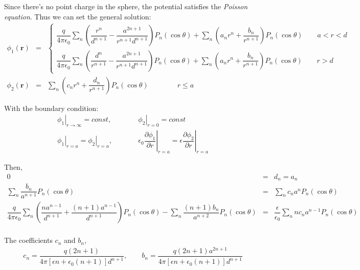 \documentclass[a4paper,9pt]{article}
\begin{document}
\begin{enumerate}
\begin{enumerate}
    Since there's no point charge in the sphere, the potential satisfies the \textit{Poisson equation}. Thus we can set the general solution:
    \begin{eqnarray}
      \phi_1(\boldsymbol{r})&=&\begin{cases}
        \dfrac{q}{4\pi\epsilon_0}\sum\limits_{n}(\dfrac{r^n}{d^{n+1}}-\dfrac{a^{2n+1}}{r^{n+1} d^{n+1}})P_n(\cos\theta)+\sum\limits_{n}(a_n r^n+\dfrac{b_n}{r^{n+1}})P_n(\cos\theta)\quad\quad a<r<d\\
        \dfrac{q}{4\pi\epsilon_0}\sum\limits_{n}(\dfrac{d^n}{r^{n+1}}-\dfrac{a^{2n+1}}{r^{n+1} d^{n+1}})P_n(\cos\theta)+\sum\limits_{n}(a_n r^n+\dfrac{b_n}{r^{n+1}})P_n(\cos\theta)\quad\quad r>d
      \end{cases}\\
      \phi_2(\boldsymbol{r})&=&\sum\limits_{n}(c_n r^n+\dfrac{d_n}{r^{n+1}})P_n(\cos\theta)\quad\quad\quad\quad r\leqslant a
    \end{eqnarray}
    
    With the boundary condition:
    \begin{eqnarray}
      \left.\phi_1\right|_{r\to\infty}=const,&&\quad\quad \left.\phi_2\right|_{r=0}=const\\
      \left.\phi_1\right|_{r=a}=\left.\phi_2\right|_{r=a},&&\quad\quad \epsilon_0\left.\dfrac{\partial \phi_1}{\partial r}\right|_{r=a}=\epsilon\left.\dfrac{\partial \phi_2}{\partial r}\right|_{r=a}
    \end{eqnarray}

    Then,
    \begin{eqnarray}
      0&=&d_n=a_n\\
      \sum_{n}\dfrac{b_n}{a^{n+1}}P_n(\cos\theta)&=&\sum_{n}c_n a^n P_n(\cos\theta)\\
      \dfrac{q}{4\pi\epsilon_0}\sum_n(\dfrac{na^{n-1}}{d^{n+1}}+\dfrac{(n+1)a^{n-1}}{d^{n+1}})P_n(\cos\theta)-\sum_{n}\dfrac{(n+1)b_n}{a^{n+2}}P_n(\cos\theta)&=&\dfrac{\epsilon}{\epsilon_0}\sum_{n}nc_n a^{n-1}P_n(\cos\theta)\nonumber\\
    \end{eqnarray}

    The coefficients $c_n$ and $b_n$,
    \begin{eqnarray}
        c_n=\dfrac{q(2n+1)}{4\pi\left[\epsilon n+\epsilon_0(n+1)\right]d^{n+1}},\quad\quad b_n=\dfrac{q(2n+1)a^{2n+1}}{4\pi\left[\epsilon n+\epsilon_0(n+1)\right]d^{n+1}}
    \end{eqnarray}


\end{enumerate}
\end{enumerate}
\end{document}
